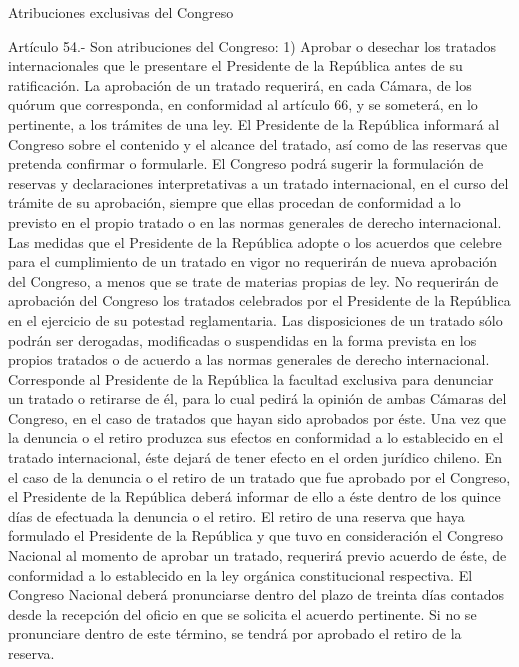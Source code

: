     Atribuciones exclusivas del Congreso



    Artículo 54.- Son atribuciones del Congreso:
    1) Aprobar o desechar los tratados internacionales que le presentare el Presidente de la República antes de su ratificación. La aprobación de un tratado requerirá, en cada Cámara, de los quórum que corresponda, en conformidad al artículo 66, y se someterá, en lo pertinente, a los trámites de una ley.
    El Presidente de la República informará al Congreso sobre el contenido y el alcance del tratado, así como de las reservas que pretenda confirmar o formularle.
    El Congreso podrá sugerir la formulación de reservas y declaraciones interpretativas a un tratado internacional, en el curso del trámite de su aprobación, siempre que ellas procedan de conformidad a lo previsto en el propio tratado o en las normas generales de derecho internacional.
    Las medidas que el Presidente de la República adopte o los acuerdos que celebre para el cumplimiento de un tratado en vigor no requerirán de nueva aprobación del Congreso, a menos que se trate de materias propias de ley. No requerirán de aprobación del Congreso los tratados celebrados por el Presidente de la República en el ejercicio de su potestad reglamentaria.
    Las disposiciones de un tratado sólo podrán ser derogadas, modificadas o suspendidas en la forma prevista en los propios tratados o de acuerdo a las normas generales de derecho internacional.
    Corresponde al Presidente de la República la facultad exclusiva para denunciar un tratado o retirarse de él, para lo cual pedirá la opinión de ambas Cámaras del Congreso, en el caso de tratados que hayan sido aprobados por éste. Una vez que la denuncia o el retiro produzca sus efectos en conformidad a lo establecido en el tratado internacional, éste dejará de tener efecto en el orden jurídico chileno.
    En el caso de la denuncia o el retiro de un tratado que fue aprobado por el Congreso, el Presidente de la República deberá informar de ello a éste dentro de los quince días de efectuada la denuncia o el retiro.
    El retiro de una reserva que haya formulado el Presidente de la República y que tuvo en consideración el Congreso Nacional al momento de aprobar un tratado, requerirá previo acuerdo de éste, de conformidad a lo establecido en la ley orgánica constitucional respectiva. El Congreso Nacional deberá pronunciarse dentro del plazo de treinta días contados desde la recepción del oficio en que se solicita el acuerdo pertinente. Si no se pronunciare dentro de este término, se tendrá por aprobado el retiro de la reserva.
